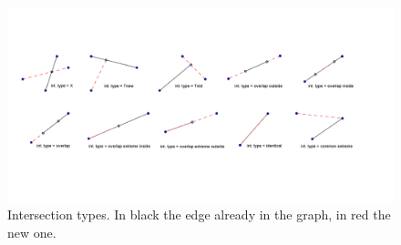 \documentclass[11pt]{article} %
\begin{document}
		\begin{figure}
			\centering 
			\includegraphics[width=1\textwidth]{int_type}
			\caption{Intersection types. In black the edge already in the graph, in red the new one.}
			\label{fig:frac_int_type}
		\end{figure}
\end{document}
